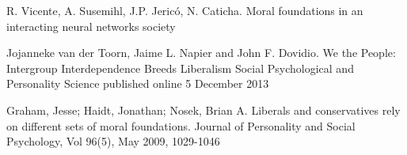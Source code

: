 \documentclass[11pt]{article}
\begin{document}
\begin{thebibliography}{99}
 R. Vicente, A. Susemihl, J.P. Jericó, N. Caticha. Moral
    foundations in an interacting neural networks society

Jojanneke van der Toorn, Jaime L. Napier and John F. Dovidio. We the People: Intergroup Interdependence Breeds Liberalism
Social Psychological and Personality Science published online 5 December 2013

 Graham, Jesse; Haidt, Jonathan; Nosek, Brian A.
    Liberals and conservatives rely on different sets of moral foundations.
Journal of Personality and Social Psychology, Vol 96(5), May 2009, 1029-1046

\end{thebibliography}
\end{document}
